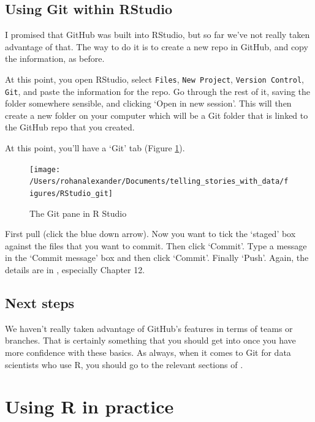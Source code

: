 \documentclass[
]{book}
\begin{document}
\hypertarget{using-git-within-rstudio}{%
\subsection{Using Git within RStudio}\label{using-git-within-rstudio}}

I promised that GitHub was built into RStudio, but so far we've not really taken advantage of that. The way to do it is to create a new repo in GitHub, and copy the information, as before.

At this point, you open RStudio, select \texttt{Files}, \texttt{New\ Project}, \texttt{Version\ Control}, \texttt{Git}, and paste the information for the repo. Go through the rest of it, saving the folder somewhere sensible, and clicking `Open in new session'. This will then create a new folder on your computer which will be a Git folder that is linked to the GitHub repo that you created.

At this point, you'll have a `Git' tab (Figure \ref{fig:rstudiogit}).

\begin{figure}
\texttt{[image: /Users/rohanalexander/Documents/telling\_stories\_with\_data/figures/RStudio\_git]} \caption{The Git pane in R Studio}\label{fig:rstudiogit}
\end{figure}

First pull (click the blue down arrow). Now you want to tick the `staged' box against the files that you want to commit. Then click `Commit'. Type a message in the `Commit message' box and then click `Commit'. Finally `Push'. Again, the details are in \citet{happygit}, especially Chapter 12.

\hypertarget{next-steps}{%
\subsection{Next steps}\label{next-steps}}

We haven't really taken advantage of GitHub's features in terms of teams or branches. That is certainly something that you should get into once you have more confidence with these basics. As always, when it comes to Git for data scientists who use R, you should go to the relevant sections of \citet{happygit}.

\hypertarget{using-r-in-practice}{%
\section{Using R in practice}\label{using-r-in-practice}}
\end{document}
